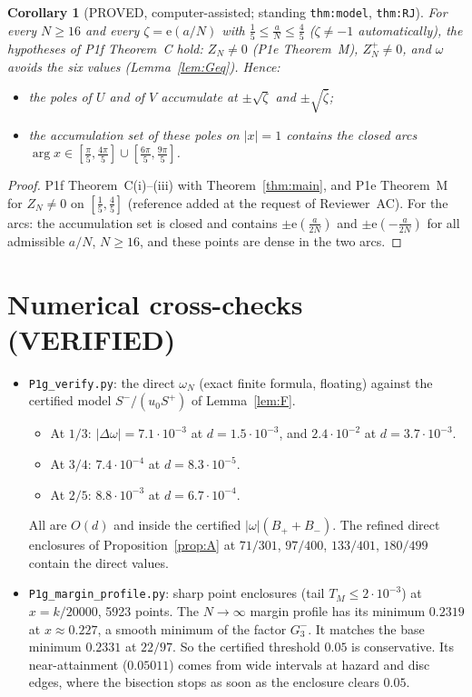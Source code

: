 \documentclass[11pt]{article}
\newtheorem{corollary}[theorem]{Corollary}
\theoremstyle{definition}\newtheorem{definition}[theorem]{Definition}
\theoremstyle{remark}\newtheorem{remark}[theorem]{Remark}
\newcommand{\e}{\mathrm{e}}
\begin{document}
\begin{corollary}[PROVED, computer-assisted; standing \texttt{thm:model}, \texttt{thm:RJ}]\label{cor:UV}
For every $N\ge16$ and every $\zeta=\e(a/N)$ with $\frac15\le\frac aN\le\frac45$ ($\zeta\ne-1$ automatically), the hypotheses of P1f Theorem~C hold: $Z_N\ne0$ (P1e Theorem~M), $Z^+_N\ne0$, and $\omega$ avoids the six values (Lemma~\ref{lem:Geq}). Hence:
\begin{itemize}
\item the poles of $U$ and of $V$ accumulate at $\pm\sqrt\zeta$ and $\pm\sqrt{\bar\zeta}$;
\item the accumulation set of these poles on $|x|=1$ contains the closed arcs $\arg x\in[\frac\pi5,\frac{4\pi}5]\cup[\frac{6\pi}5,\frac{9\pi}5]$.
\end{itemize}
\end{corollary}
\begin{proof}
P1f Theorem~C(i)--(iii) with Theorem~\ref{thm:main}, and P1e Theorem~M for $Z_N\ne0$ on $[\frac15,\frac45]$ (reference added at the request of Reviewer~AC). For the arcs: the accumulation set is closed and contains $\pm\e(\frac a{2N})$ and $\pm\e(-\frac a{2N})$ for all admissible $a/N$, $N\ge16$, and these points are dense in the two arcs.
\end{proof}

\section{Numerical cross-checks (VERIFIED)}
\begin{itemize}
\item \texttt{P1g\_verify.py}: the direct $\omega_N$ (exact finite formula, floating) against the certified model $S^-/(u_0S^+)$ of Lemma~\ref{lem:F}.
 \begin{itemize}
 \item At $1/3$: $|\Delta\omega|=7.1\cdot10^{-3}$ at $d=1.5\cdot10^{-3}$, and $2.4\cdot10^{-2}$ at $d=3.7\cdot10^{-3}$.
 \item At $3/4$: $7.4\cdot10^{-4}$ at $d=8.3\cdot10^{-5}$.
 \item At $2/5$: $8.8\cdot10^{-3}$ at $d=6.7\cdot10^{-4}$.
 \end{itemize}
 All are $O(d)$ and inside the certified $|\omega|(B_++B_-)$.
 The refined direct enclosures of Proposition~\ref{prop:A} at $71/301$, $97/400$, $133/401$, $180/499$ contain the direct values.
\item \texttt{P1g\_margin\_profile.py}: sharp point enclosures (tail $T_M\le2\cdot10^{-3}$) at $x=k/20000$, 5923 points. The $N\to\infty$ margin profile has its minimum $0.2319$ at $x\approx0.227$, a smooth minimum of the factor $G_3^-$. It matches the base minimum $0.2331$ at $22/97$.
 So the certified threshold $0.05$ is conservative. Its near-attainment ($0.05011$) comes from wide intervals at hazard and disc edges, where the bisection stops as soon as the enclosure clears $0.05$.
\end{itemize}
\end{document}
